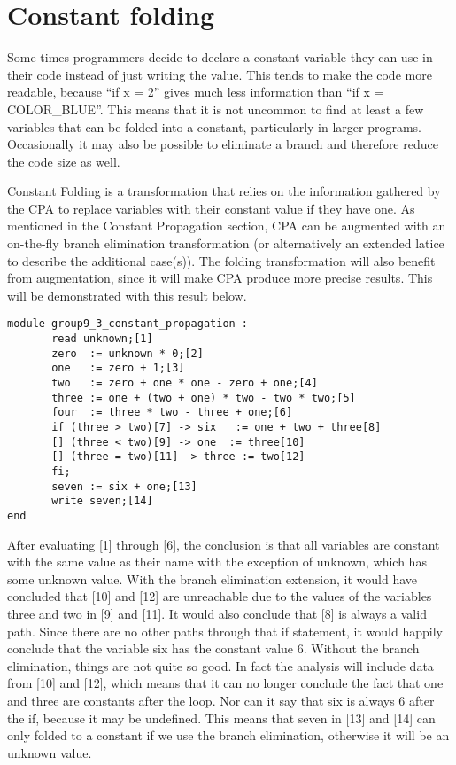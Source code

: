 \section{Constant folding}
Some times programmers decide to declare a constant variable they can use
in their code instead of just writing the value. This tends to make the
code more readable, because ``if x = 2'' gives much less information than
``if x = COLOR\_BLUE''.
  This means that it is not uncommon to find at least a few variables
that can be folded into a constant, particularly in larger programs.
Occasionally it may also be possible to eliminate a branch and therefore
reduce the code size as well.  

\docpar
Constant Folding is a transformation that relies on the information
gathered by the CPA to replace variables with their constant value
if they have one.
  As mentioned in the Constant Propagation section,
CPA can be augmented with an on-the-fly branch elimination transformation
(or alternatively an extended latice to describe the additional case(s)).
The folding transformation will also benefit from augmentation, since it
will make CPA produce more precise results. This will be demonstrated with
this result below.

\begin{lstlisting}
module group9_3_constant_propagation :
       read unknown;[1]
       zero  := unknown * 0;[2]
       one   := zero + 1;[3]
       two   := zero + one * one - zero + one;[4]
       three := one + (two + one) * two - two * two;[5]
       four  := three * two - three + one;[6]
       if (three > two)[7] -> six   := one + two + three[8]
       [] (three < two)[9] -> one  := three[10]
       [] (three = two)[11] -> three := two[12]
       fi;
       seven := six + one;[13]
       write seven;[14]
end
\end{lstlisting}

\docpar
After evaluating [1] through [6], the conclusion is that all variables are constant
with the same value as their name with the exception of unknown, which has some
unknown value. 
  With the branch elimination extension, it would have concluded that [10] and
[12] are unreachable due to the values of the variables three and two in [9] and
[11]. It would also conclude that [8] is always a valid path. Since there are
no other paths through that if statement, it would happily conclude that the
variable six has the constant value 6.
  Without the  branch elimination, things are not quite so good. In fact the
analysis will include data from [10] and [12], which means that it can no
longer conclude the fact that one and three are constants after the loop.
Nor can it say that six is always 6 after the if, because it may be undefined.
  This means that seven in [13] and [14] can only folded to a constant if we
use the branch elimination, otherwise it will be an unknown value.

